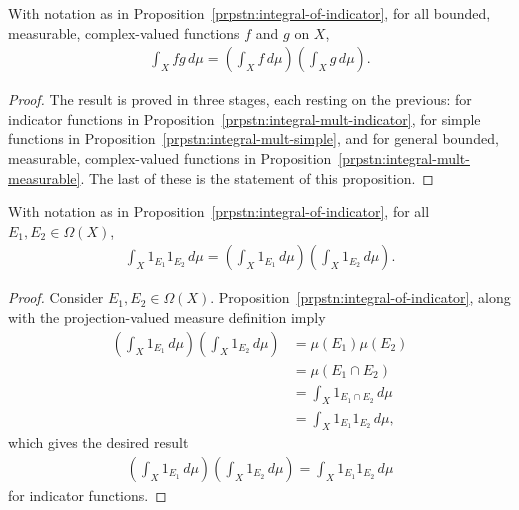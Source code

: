 \begin{proposition}
    \label{prpstn:integral-multiplicative}
    \leanok
    With notation as in Proposition~\ref{prpstn:integral-of-indicator}, for all bounded, measurable, complex-valued functions $f$ and $g$ on $X$,
    \begin{align}
        \int_X fg \, d\mu = \left( \int_X f \, d\mu \right) \left( \int_X g \, d\mu \right).
    \end{align}
\end{proposition}
\begin{proof}
    \leanok
The result is proved in three stages, each resting on the previous: for indicator functions in Proposition~\ref{prpstn:integral-mult-indicator}, for simple functions in Proposition~\ref{prpstn:integral-mult-simple}, and for general bounded, measurable, complex-valued functions in Proposition~\ref{prpstn:integral-mult-measurable}. The last of these is the statement of this proposition.
\end{proof}

\begin{proposition}
    \label{prpstn:integral-mult-indicator}
    \leanok
    With notation as in Proposition~\ref{prpstn:integral-of-indicator}, for all $E_1, E_2 \in \Omega(X)$,
    \begin{align}
        \int_X 1_{E_1} 1_{E_2} \, d\mu = \left( \int_X 1_{E_1} \, d\mu \right) \left( \int_X 1_{E_2} \, d\mu \right).
    \end{align}
\end{proposition}
\begin{proof}
    \leanok
Consider $E_1, E_2 \in \Omega(X)$. Proposition~\ref{prpstn:integral-of-indicator}, along with the projection-valued measure definition imply
\begin{align}
    \left( \int_X 1_{E_1} \, d\mu \right) \left( \int_X 1_{E_2} \, d\mu \right) &= \mu(E_1) \mu(E_2) \\
                                                                                &= \mu(E_1 \cap E_2) \\
                                                                                &= \int_X 1_{E_1 \cap E_2} \, d\mu \\
                                                                                &= \int_X 1_{E_1} 1_{E_2} \, d\mu,
\end{align}
which gives the desired result
\begin{align}
    \left( \int_X 1_{E_1} \, d\mu \right) \left( \int_X 1_{E_2} \, d\mu \right) = \int_X 1_{E_1} 1_{E_2} \, d\mu
\end{align}
for indicator functions.
\end{proof}

